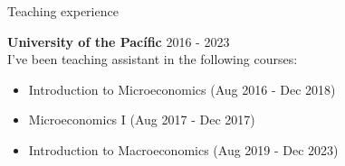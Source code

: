 \documentclass{resume} %
\begin{document}
\begin{rSection}{Teaching experience}

{\bf University of the Pacífic}  \hfill {2016 - 2023}\\
I've been teaching assistant in the following courses:
\begin{itemize}
    \itemsep -3pt {}
    \item Introduction to Microeconomics (Aug 2016 - Dec 2018)
    \item Microeconomics I (Aug 2017 - Dec 2017)
    \item Introduction to Macroeconomics (Aug 2019 - Dec 2023)
\end{itemize}

\end{rSection}

\end{document}
